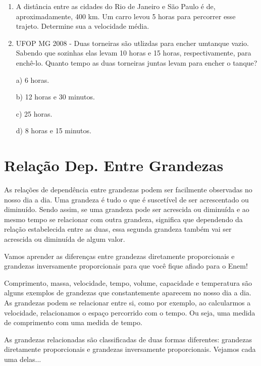 \begin{multicols*}{2}
\begin{enumerate}
a) 2/6 = 9/x

b) 1/3 = y/12

c) z/10 = 6/5

d) 8/t = 2/15\\

			\item A distância entre as cidades do Rio de Janeiro e São Paulo é de, aproximadamente, 400 km. Um carro levou 5 horas para percorrer esse trajeto. Determine sua a velocidade média.\\
			
			\item UFOP MG 2008 - Duas torneiras são utlizdas para encher umtanque vazio. Sabendo que sozinhas elas levam 10 horas e 15 horas, respectivamente, para enchê-lo. Quanto tempo as duas torneiras juntas levam para encher o tanque?
			
a)	6 horas.

b) 12 horas e 30 minutos.

c) 25 horas.

d) 8 horas e 15 minutos.\\
			
			\end{enumerate}
			
\section*{Relação Dep. Entre Grandezas}

	As relações de dependência entre grandezas podem ser facilmente observadas no nosso dia a dia. Uma grandeza é tudo o que é suscetível de ser acrescentado ou diminuído. Sendo assim, se uma grandeza pode ser acrescida ou diminuída e ao mesmo tempo se relacionar com outra grandeza, significa que dependendo da relação estabelecida entre as duas, essa segunda grandeza também vai ser acrescida ou diminuída de algum valor.

	Vamos aprender as diferenças entre grandezas diretamente proporcionais e grandezas inversamente proporcionais para que você fique afiado para o Enem!
	
	Comprimento, massa, velocidade, tempo, volume, capacidade e temperatura são alguns exemplos de grandezas que constantemente aparecem no nosso dia a dia. As grandezas podem se relacionar entre si,  como por exemplo, ao calcularmos a velocidade, relacionamos o espaço percorrido com o tempo. Ou seja, uma medida de comprimento com uma medida de tempo.	
	
	As grandezas relacionadas são classificadas de duas formas diferentes: grandezas diretamente proporcionais  e grandezas inversamente proporcionais. Vejamos cada uma delas...
		

\end{multicols*}
